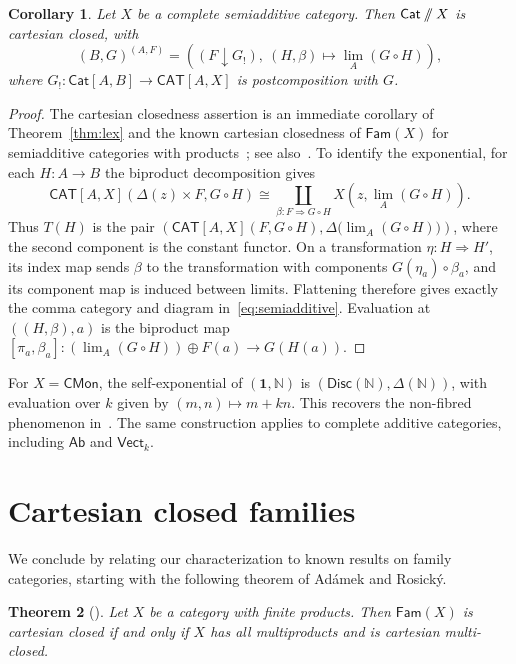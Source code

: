 \documentclass[11pt,a4paper]{amsart}
\newtheorem{theorem}{Theorem}[section]
\newtheorem{corollary}[theorem]{Corollary}
\theoremstyle{definition}
\numberwithin{equation}{section}
\newcommand{\Cat}{\mathsf{Cat}}
\newcommand{\CAT}{\mathsf{CAT}}
\newcommand{\Fam}{\mathsf{Fam}}
\newcommand{\CMon}{\mathsf{CMon}}
\newcommand{\Vect}{\mathsf{Vect}}
\newcommand{\Ab}{\mathsf{Ab}}
\newcommand{\Disc}{\mathsf{Disc}}
\newcommand{\one}{\mathbf{1}}
\newcommand{\sslash}{\mathbin{/\mkern-6mu/}}
\newcommand{\DX}{\Cat\sslash X}
\begin{document}
\begin{corollary}\label{cor:semiadditive}
Let $X$ be a complete semiadditive category. Then $\DX$ is cartesian closed, with
\begin{equation}\label{eq:semiadditive}
 (B,G)^{(A,F)}=
 \left((F\downarrow G_!),\ (H,\beta)\longmapsto\lim_A(G\circ H)\right),
\end{equation}
where $G_!:\Cat[A,B]\to\CAT[A,X]$ is postcomposition with $G$.
\end{corollary}
\begin{proof}
The cartesian closedness assertion is an immediate corollary of Theorem~\ref{thm:lex} and the known cartesian closedness of $\Fam(X)$ for semiadditive categories with products~\cite[Proposition~74]{CHAD}; see also~\cite[Section~9]{NV}. To identify the exponential, for each $H:A\to B$ the biproduct decomposition gives
\[
 \CAT[A,X](\Delta(z)\times F,G\circ H)
 \cong\coprod_{\beta:F\Rightarrow G\circ H}X\left(z,\lim_A(G\circ H)\right).
\]
Thus $T(H)$ is the pair $(\CAT[A,X](F,G\circ H),\Delta\bigl(\lim_A(G\circ H)\bigr))$, where the second component is the constant functor. On a transformation $\eta:H\Rightarrow H'$, its index map sends $\beta$ to the transformation with components $G(\eta_a)\circ\beta_a$, and its component map is induced between limits. Flattening therefore gives exactly the comma category and diagram in~\eqref{eq:semiadditive}. Evaluation at $((H,\beta),a)$ is the biproduct map
$[\pi_a,\beta_a]:(\lim_A(G\circ H))\oplus F(a)\to G(H(a))$.
\end{proof}

For $X=\CMon$, the self-exponential of $(\one,\mathbb N)$ is $(\Disc(\mathbb N),\Delta(\mathbb N))$, with evaluation over $k$ given by $(m,n)\mapsto m+kn$. This recovers the non-fibred phenomenon in~\cite{NV}. The same construction applies to complete additive categories, including $\Ab$ and $\Vect_k$.

\section{Cartesian closed families}\label{sec:closedfamilies}

We conclude by relating our characterization to known results on family categories, starting with the following theorem of Ad\'amek and Rosick\'y.

\begin{theorem}[{\cite[Theorem~2.11]{AR}}]\label{thm:AR}
Let $X$ be a category with finite products. Then $\Fam(X)$ is cartesian closed if and only if $X$ has all multiproducts and is cartesian multi-closed.
\end{theorem}
\end{document}
